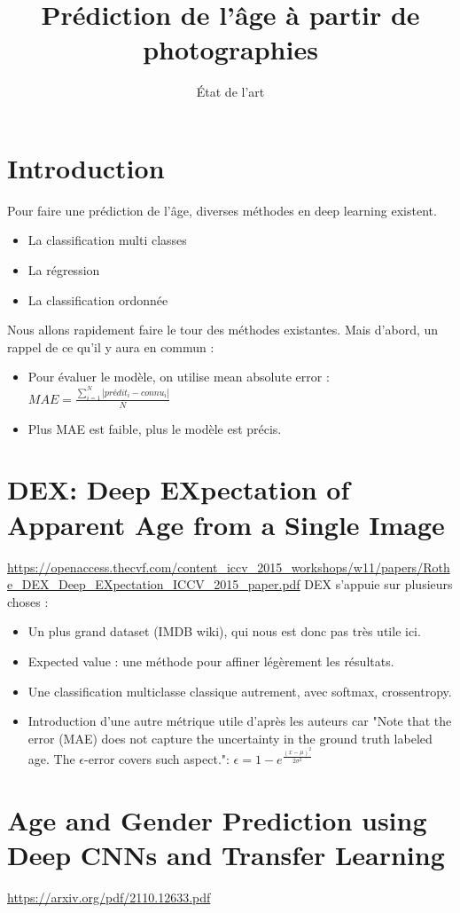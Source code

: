 \documentclass{article}
\title{Prédiction de l'âge à partir de photographies}
\date{État de l'art}
\begin{document}
\maketitle

\section{Introduction}
Pour faire une prédiction de l'âge, diverses méthodes en deep learning existent.
\begin{itemize}
    \item La classification multi classes
    \item La régression
    \item La classification ordonnée
\end{itemize}
Nous allons rapidement faire le tour des méthodes existantes. Mais d'abord, un rappel de ce qu'il y aura en commun :
\begin{itemize}
    \item Pour évaluer le modèle, on utilise mean absolute error : $MAE = \frac{\sum^{N}_{i=1}|prédit_{i}-connu_{i}|}{N}$
    \item Plus MAE est faible, plus le modèle est précis.
\end{itemize}

\section{DEX: Deep EXpectation of Apparent Age from a Single Image}
\url{https://openaccess.thecvf.com/content_iccv_2015_workshops/w11/papers/Rothe_DEX_Deep_EXpectation_ICCV_2015_paper.pdf}
DEX s'appuie sur plusieurs choses :
\begin{itemize}
    \item Un plus grand dataset (IMDB wiki), qui nous est donc pas très utile ici.
    \item Expected value : une méthode pour affiner légèrement les résultats.
    \item Une classification multiclasse classique autrement, avec softmax, crossentropy.
    \item Introduction d'une autre métrique utile d'après les auteurs car "Note that the error (MAE) does not capture the uncertainty in the ground truth labeled age. The $\epsilon$-error covers such aspect.": $\epsilon = 1-e^{\frac{(x-\mu)^2}{2\sigma^2}}$
    
\end{itemize}

\section{Age and Gender Prediction using Deep CNNs and Transfer Learning}
\url{https://arxiv.org/pdf/2110.12633.pdf}
\end{document}
